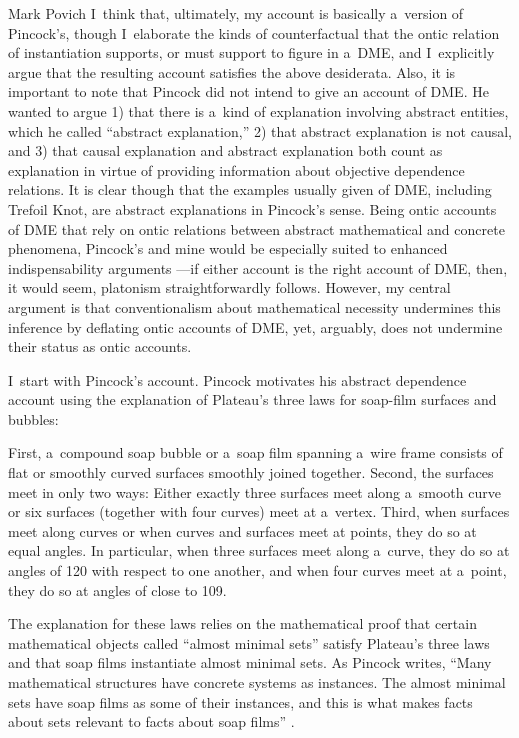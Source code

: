 \begin{artengenv}{Mark Povich}
I~think that, ultimately, my account is basically a~version of Pincock's, though I~elaborate the kinds of counterfactual that the ontic relation of instantiation supports, or must support to figure in a~DME, and I~explicitly argue that the resulting account satisfies the above desiderata. Also, it is important to note that Pincock did not intend to give an account of DME. He wanted to argue 1) that there is a~kind of explanation involving abstract entities, which he called ``abstract explanation,'' 2) that abstract explanation is not causal, and 3) that causal explanation and abstract explanation both count as explanation in virtue of providing information about objective dependence relations. It is clear though that the examples usually given of DME, including Trefoil Knot, are abstract explanations in Pincock's sense. Being ontic accounts of DME that rely on ontic relations between abstract mathematical and concrete phenomena, Pincock's and mine would be especially suited to enhanced indispensability arguments
\parencite[][]{baker_mathematical_2009}%
---if either account is the right account of DME, then, it would seem, platonism straightforwardly follows. However, my central argument is that conventionalism about mathematical necessity undermines this inference by deflating ontic accounts of DME, yet, arguably, does not undermine their status as ontic accounts.

I~start with Pincock's
\parencite*[][]{pincock_abstract_2015} %
 account. Pincock motivates his abstract dependence account using the explanation of Plateau's three laws for soap-film surfaces and bubbles:

First, a~compound soap bubble or a~soap film spanning a~wire frame consists of flat or smoothly curved surfaces smoothly joined together. Second, the surfaces meet in only two ways: Either exactly three surfaces meet along a~smooth curve or six surfaces (together with four curves) meet at a~vertex. Third, when surfaces meet along curves or when curves and surfaces meet at points, they do so at equal angles. In particular, when three surfaces meet along a~curve, they do so at angles of 120 with respect to one another, and when four curves meet at a~point, they do so at angles of close to 109.
\parencites[][p.82]{almgren_geometry_1976}[quoted in][p.858]{pincock_abstract_2015}%


The explanation for these laws relies on the mathematical proof that certain mathematical objects called ``almost minimal sets'' satisfy Plateau's three laws and that soap films instantiate almost minimal sets. As Pincock writes, ``Many mathematical structures have concrete systems as instances. The almost minimal sets have soap films as some of their instances, and this is what makes facts about sets relevant to facts about soap films''
\parencite[][pp.865–866]{pincock_abstract_2015}.%



\end{artengenv}

